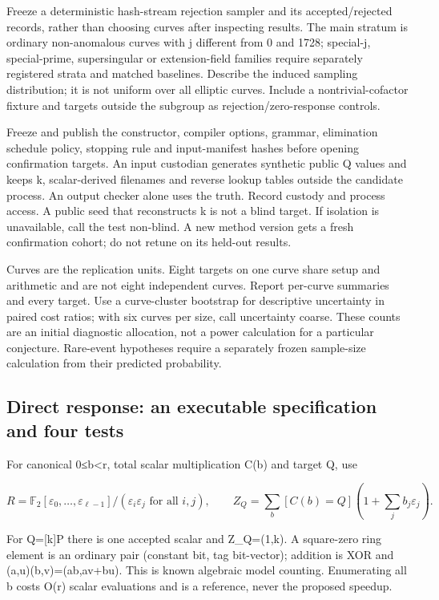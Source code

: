 \documentclass[
  10pt,
]{article}
\begin{document}
Freeze a deterministic hash-stream rejection sampler and its
accepted/rejected records, rather than choosing curves after inspecting
results. The main stratum is ordinary non-anomalous curves with j
different from 0 and 1728; special-j, special-prime, supersingular or
extension-field families require separately registered strata and
matched baselines. Describe the induced sampling distribution; it is not
uniform over all elliptic curves. Include a nontrivial-cofactor fixture
and targets outside the subgroup as rejection/zero-response controls.

Freeze and publish the constructor, compiler options, grammar,
elimination schedule policy, stopping rule and input-manifest hashes
before opening confirmation targets. An input custodian generates
synthetic public Q values and keeps k, scalar-derived filenames and
reverse lookup tables outside the candidate process. An output checker
alone uses the truth. Record custody and process access. A public seed
that reconstructs k is not a blind target. If isolation is unavailable,
call the test non-blind. A new method version gets a fresh confirmation
cohort; do not retune on its held-out results.

Curves are the replication units. Eight targets on one curve share setup
and arithmetic and are not eight independent curves. Report per-curve
summaries and every target. Use a curve-cluster bootstrap for
descriptive uncertainty in paired cost ratios; with six curves per size,
call uncertainty coarse. These counts are an initial diagnostic
allocation, not a power calculation for a particular conjecture.
Rare-event hypotheses require a separately frozen sample-size
calculation from their predicted probability.

\subsection{Direct response: an executable specification and four
tests}\label{direct-response-an-executable-specification-and-four-tests}

For canonical 0≤b\textless r, total scalar multiplication C(b) and
target Q, use

\[R=\mathbb F_2[\varepsilon_0,\ldots,\varepsilon_{\ell-1}]/(\varepsilon_i\varepsilon_j\text{ for all }i,j),\qquad
Z_Q=\sum_b [C(b)=Q]\left(1+\sum_j b_j\varepsilon_j\right).\]

For Q={[}k{]}P there is one accepted scalar and Z\_Q=(1,k). A
square-zero ring element is an ordinary pair (constant bit, tag
bit-vector); addition is XOR and (a,u)(b,v)=(ab,av+bu). This is known
algebraic model counting. Enumerating all b costs O(r) scalar
evaluations and is a reference, never the proposed speedup.
\end{document}
